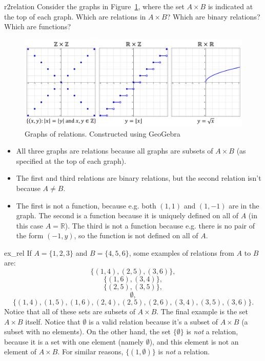 \begin{example}{r2relation}
Consider the graphs in Figure~\ref{fig:graphrelations}, where the set $A \times B$ is indicated at the top of each graph. Which are relations in $A \times B$? Which are binary relations? Which are functions?

\begin{figure}[htbp]
\begin{center}
\includegraphics[width=5in]{images/graphrelations.png}
\caption{Graphs of relations. Constructed using GeoGebra}\label{fig:graphrelations}
\end{center}
\end{figure}

\begin{itemize}
\item
All three graphs are relations because all graphs are subsets of $A \times B$ (as specified at the top of each graph).
\item
The first and third relations are binary relations, but the second relation isn't because $A \neq B$.
\item
The first is not a function, because e.g. both $(1,1)$ and $(1,-1)$ are in the graph. 
The second is a function because it is uniquely defined on all of $A$ (in this case $A=\mathbb{R}$). The third is not a function because e.g. there is no pair of the form $(-1,y)$, so the function is not defined on all of $A$.
\end{itemize}
\end{example}

\begin{example}{ex_rel}
If $A = \{1,2,3\}$ and $B = \{4,5,6\}$, some examples of relations from $A$ to $B$ are:
\[ \{ (1,4), (2,5), (3,6)\}, \]
\[ \{ (1,6), (3,4)\}, \]
\[ \{ (2,5), (3,5) \}, \]
\[ \emptyset, \]
\[ \{ (1,4), (1,5), (1,6), (2,4), (2,5), (2,6), (3,4), (3,5), (3,6) \}.\] 
Notice that all of these sets are subsets of $A \times B$. The final example is the set $A \times B$ itself. Notice that $\emptyset$ is a valid relation because it's a subset of $A \times B$ (a subset with no elements).  On the other hand, the set $\{ \emptyset \}$ is \emph{not} a relation, because it is  a set with one element (namely $\emptyset$), and this element is not an element of $A \times B$. For similar reasons, $\{(1, \emptyset) \}$ is \emph{not} a relation.
\end{example}

